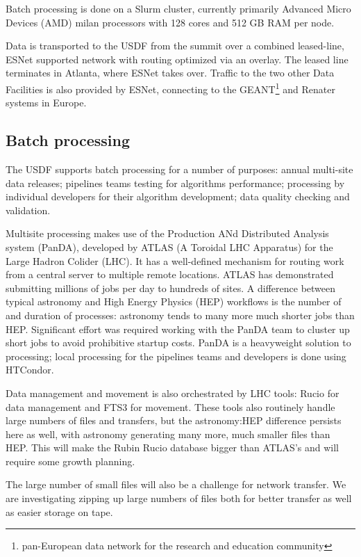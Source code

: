 Batch processing is done on a Slurm cluster, currently primarily Advanced Micro Devices (AMD) milan
processors with 128 cores and 512 GB RAM per node.

Data is transported to the USDF from the summit over a combined
leased-line, ESNet supported network with routing optimized via an
overlay. The leased line terminates in Atlanta, where ESNet takes
over. Traffic to the two other Data Facilities is also provided by
ESNet, connecting to the GEANT\footnote{pan-European data network for the research and education community}
 and Renater systems in Europe.

\subsection{Batch processing}

The USDF supports batch processing for a number of purposes: annual
multi-site data releases; pipelines teams testing for algorithms
performance; processing by individual developers for their algorithm
development; data quality checking and validation.

Multisite processing makes use of the Production ANd Distributed Analysis system (PanDA),\cite{2024CSBS....8....4M} developed
by ATLAS (A Toroidal LHC Apparatus) for the Large Hadron Colider (LHC).
It has a well-defined mechanism for routing work
from a central server to multiple remote locations. ATLAS has
demonstrated submitting millions of jobs per day to hundreds of sites.
A difference between typical astronomy and High Energy Physics (HEP) workflows is the
number of and duration of processes: astronomy tends to many more much
shorter jobs than HEP.\cite{2023arXiv231204921K} Significant effort was required working with the PanDA
team to cluster up short jobs to avoid prohibitive startup costs.
PanDA is a heavyweight solution to processing; local processing for
the pipelines teams and developers is done using HTCondor.

Data management and movement is also orchestrated by LHC tools: Rucio
for data management and FTS3 for movement. These tools also routinely
handle large numbers of files and transfers, but the astronomy:HEP
difference persists here as well, with astronomy generating many more,
much smaller files than HEP. This will make the Rubin Rucio database
bigger than ATLAS's and will require some growth planning.

The large number of small files will also be a challenge for network
transfer. We are investigating zipping up large numbers of files both
for better transfer as well as easier storage on tape.

